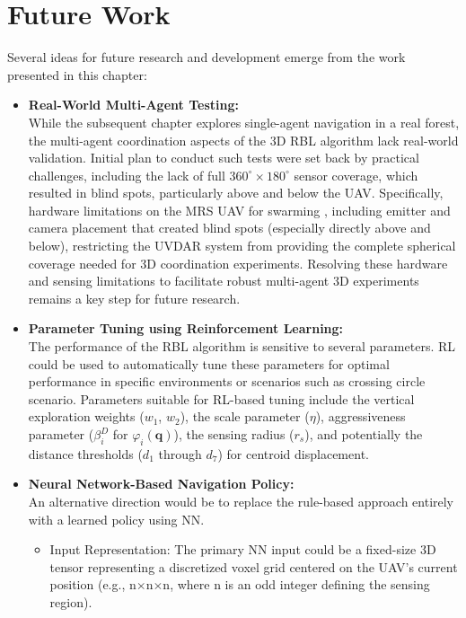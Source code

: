     \section{Future Work}
        Several ideas for future research and development emerge from the work presented in this chapter:
        \begin{itemize}
            \item \textbf{Real-World Multi-Agent Testing: } \\
            While the subsequent chapter explores single-agent navigation in a real forest, the multi-agent coordination aspects of the 3D RBL algorithm lack real-world validation. 
            Initial plan to conduct such tests were set back by practical challenges, including the lack of full $360^{\circ} \times 180^{\circ}$ sensor coverage, which resulted in blind spots, particularly above and below the \ac{UAV}.
            Specifically, hardware limitations on the \ac{MRS} \ac{UAV} for swarming \cite{robofly}, including emitter and camera placement that created blind spots (especially directly above and below), restricting the UVDAR system \cite{uvdar_package} from providing the complete spherical coverage needed for 3D coordination experiments.
            Resolving these hardware and sensing limitations to facilitate robust multi-agent 3D experiments remains a key step for future research.
            \item \textbf{Parameter Tuning using Reinforcement Learning: } \\
            The performance of the \ac{RBL} algorithm is sensitive to several parameters. 
            \ac{RL} could be used to automatically tune these parameters for optimal performance in specific environments or scenarios such as crossing circle scenario. 
            Parameters suitable for \ac{RL}-based tuning include the vertical exploration weights ($w_1$, $w_2$), the scale parameter ($\eta$), aggressiveness parameter ($\beta_i^D$ for $\varphi_i(\mathbf{q})$), the sensing radius ($r_s$), and potentially the distance thresholds ($d_1$ through $d_7$) for centroid displacement.
            \item \textbf{Neural Network-Based Navigation Policy: } \\
                An alternative direction would be to replace the rule-based approach entirely with a learned policy using \ac{NN}.
                \begin{itemize}
                    \item Input Representation: The primary \ac{NN} input could be a fixed-size 3D tensor representing a discretized voxel grid centered on the \ac{UAV}'s current position (e.g., n$\times$n$\times$n, where n is an odd integer defining the sensing region). 

\end{itemize}
\end{itemize}
